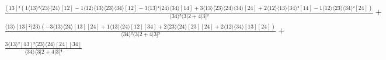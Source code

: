 \documentclass[varwidth, border=5pt]{standalone}
\begin{document}
\begin{my}
$\begin{gathered}
\scriptscriptstyle\frac{[13]²(1⟨13⟩²⟨23⟩⟨24⟩[12]-1⟨12⟩⟨13⟩⟨23⟩⟨34⟩[12]-3⟨13⟩²⟨24⟩⟨34⟩[14]+3⟨13⟩⟨23⟩⟨24⟩⟨34⟩[24]+2⟨12⟩⟨13⟩⟨34⟩²[14]-1⟨12⟩⟨23⟩⟨34⟩²[24])}{⟨34⟩³⟨3|2+4|3]²} +\\
\scriptscriptstyle\frac{⟨13⟩[13]²⟨23⟩(-3⟨13⟩⟨24⟩[13][24]+1⟨13⟩⟨24⟩[12][34]+2⟨23⟩⟨24⟩[23][24]+2⟨12⟩⟨34⟩[13][24])}{⟨34⟩²⟨3|2+4|3]³} +\\
\scriptscriptstyle\frac{3⟨13⟩²[13]³⟨23⟩⟨24⟩[24][34]}{⟨34⟩⟨3|2+4|3]⁴} \phantom{+}
\end{gathered}$
\end{my}
\end{document}

